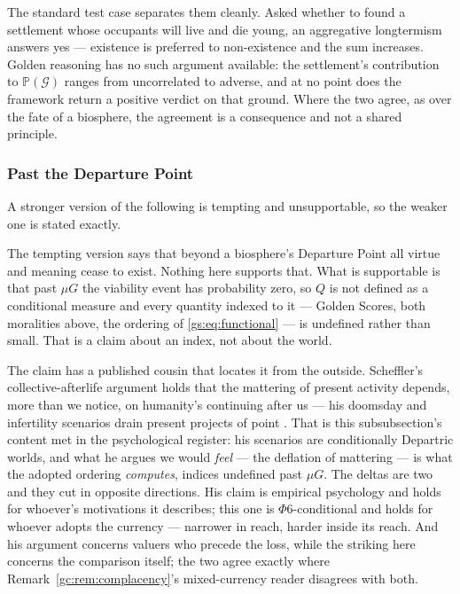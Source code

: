 \documentclass[11pt]{article}
\numberwithin{equation}{section}
\theoremstyle{plain}
\theoremstyle{definition}
\theoremstyle{remark}
\newcommand{\PP}{\mathbb{P}}
\begin{document}
The standard test case separates them cleanly. Asked whether to found a
settlement whose occupants will live and die young, an aggregative
longtermism answers yes --- existence is preferred to non-existence and
the sum increases. Golden reasoning has no such argument available: the
settlement's contribution to $\PP(\mathcal G)$ ranges from uncorrelated
to adverse, and at no point does the framework return a positive verdict
on that ground. Where the two agree, as over the fate of a biosphere,
the agreement is a consequence and not a shared principle.

\subsubsection{Past the Departure Point}\label{gs:ssub:departric}

A stronger version of the following is tempting and unsupportable, so the
weaker one is stated exactly.

The tempting version says that beyond a biosphere's Departure Point all
virtue and meaning cease to exist. Nothing here supports that. What is
supportable is that past $\mu G$ the viability event has probability
zero, so $Q$ is not defined as a conditional measure and every quantity
indexed to it --- Golden Scores, both moralities above, the ordering of
\eqref{gs:eq:functional} --- is undefined rather than small. That is a
claim about an index, not about the world.

The claim has a published cousin that locates it from the outside.
Scheffler's collective-afterlife argument holds that the mattering of
present activity depends, more than we notice, on humanity's continuing
after us --- his doomsday and infertility scenarios drain present
projects of point \cite{Scheffler13}. That is this subsubsection's
content met in the psychological register: his scenarios are
conditionally Departric worlds, and what he argues we would \emph{feel}
--- the deflation of mattering --- is what the adopted ordering
\emph{computes}, indices undefined past $\mu G$. The deltas are two
and they cut in opposite directions. His claim is empirical psychology
and holds for whoever's motivations it describes; this one is
$\Phi6$-conditional and holds for whoever adopts the currency ---
narrower in reach, harder inside its reach. And his argument concerns
valuers who precede the loss, while the striking here concerns the
comparison itself; the two agree exactly where
Remark~\ref{gc:rem:complacency}'s mixed-currency reader disagrees with
both.
\end{document}
